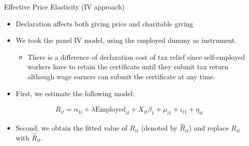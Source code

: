 \documentclass[
  ignorenonframetext,
  aspectratio=169,
]{beamer}
\providecommand{\tightlist}{%
  \setlength{\itemsep}{0pt}\setlength{\parskip}{0pt}}
\begin{document}
\begin{frame}{Effective Price Elasticity (IV approach)}
\protect\hypertarget{effective-price-elasticity-iv-approach}{}
\begin{itemize}
\tightlist
\item
  Declaration affects both giving price and charitable giving
\item
  We took the panel IV model, using the employed dummy as instrument.

  \begin{itemize}
  \tightlist
  \item
    There is a difference of declaration cost of tax relief since self-employed workers have to retain the certificate until they submit tax return although wage earners can submit the certificate at any time.
  \end{itemize}
\item
  First, we estimate the following model:
\end{itemize}

\begin{align}
  R_{it}
  = \alpha_{1i} + \lambda \text{Employed}_{it} + X_{it} \beta_1
  + \mu_{i1} + \iota_{t1} + \eta_{it} \label{eq:stage1}
\end{align}

\begin{itemize}
\tightlist
\item
  Second, we obtain the fitted value of \(R_{it}\) (denoted by \(\hat{R}_{it}\)) and replace \(R_{it}\) with \(\hat{R}_{it}\).
\end{itemize}
\end{frame}
\end{document}
